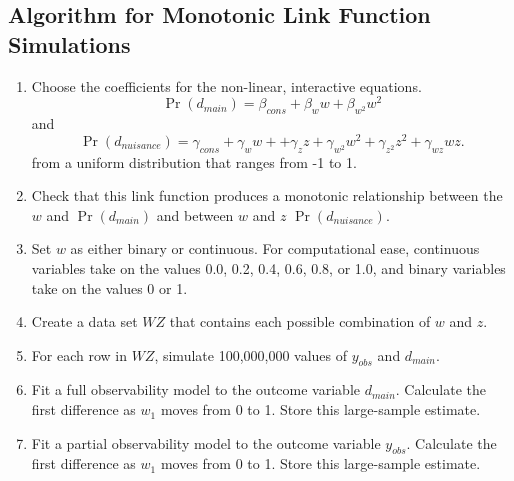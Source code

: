 \documentclass[10pt]{article}
\begin{document}
\begin{appendix}
\section{Algorithm for Monotonic Link Function Simulations}\label{app:mon}

\begin{enumerate}
\item Choose the coefficients for the non-linear, interactive equations.
\begin{equation}
\Pr(d_{main}) = \beta_{cons} + \beta_w w + \beta_{w^2} w^2 \nonumber
\end{equation}
and 
\begin{equation}
\Pr(d_{nuisance}) = \gamma_{cons} + \gamma_w w + + \gamma_z z + \gamma_{w^2} w^2 + \gamma_{z^2} z^2 + \gamma_{wz} wz \text{.}\nonumber
\end{equation}
from a uniform distribution that ranges from -1 to 1.
\item Check that this link function produces a monotonic relationship between the $w$ and $\Pr(d_{main})$ and between $w$ and $z$ $\Pr(d_{nuisance})$. 
\item Set $w$ as either binary or continuous. For computational ease, continuous variables take on the values 0.0, 0.2, 0.4, 0.6, 0.8, or 1.0, and binary variables take on the values 0 or 1.
\item Create a data set $WZ$ that contains each possible combination of $w$ and $z$. 
\item For each row in $WZ$, simulate 100,000,000 values of $y_{obs}$ and $d_{main}$.
\item Fit a full observability model to the outcome variable $d_{main}$. Calculate the first difference as $w_1$ moves from 0 to 1. Store this large-sample estimate.
\item Fit a partial observability model to the outcome variable $y_{obs}$. Calculate the first difference as $w_1$ moves from 0 to 1. Store this large-sample estimate.
\end{enumerate}



\end{appendix}
\end{document}
